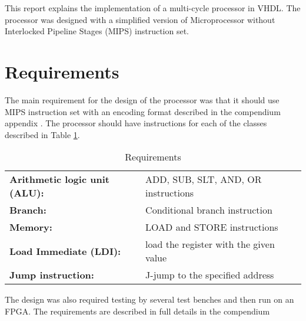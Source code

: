 This report explains the implementation of a multi-cycle processor in VHDL. The processor was designed with a simplified version of Microprocessor without Interlocked Pipeline Stages (MIPS) instruction set. 

\section{Requirements}

The main requirement for the design of the processor was that it should use MIPS instruction set with an encoding format described in the compendium appendix \cite[p. 64]{compendium}. The processor should have instructions for each of the classes described in Table \ref{t:req}.

\begin{table}[H]
     \caption {Requirements}
	\label{t:req}
    \centering
    \begin{tabular} {l l}
       	 \bf Arithmetic logic unit (ALU): & ADD, SUB, SLT, AND, OR instructions \\
       	 \bf Branch: & Conditional branch instruction \\
	     \bf Memory: & LOAD and STORE instructions  \\
	     \bf Load Immediate (LDI): & load the register with the given value \\
	     \bf Jump instruction: & J-jump to the specified address \\

    \end{tabular}
\end{table}


The design was also required testing by several test benches and then run on an FPGA. The requirements are described in full details in the compendium \cite[p. 44]{compendium}
